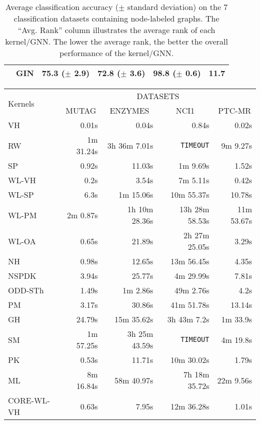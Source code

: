 \documentclass[twoside,11pt]{article}
\begin{document}
\begin{table}[!t]
\begin{tabular}{llcccc}
& GIN & 75.3 {\tiny ($\pm$ 2.9)} & 72.8 {\tiny ($\pm$ 3.6)} & 98.8 {\tiny ($\pm$ 0.6)} & \multicolumn{1}{c}{11.7} \\
\bottomrule
\end{tabular}
\caption{Average classification accuracy ($\pm$ standard deviation) on the $7$ classification datasets containing node-labeled graphs. The ``Avg. Rank'' column illustrates the average rank of each kernel/GNN. The lower the average rank, the better the overall performance of the kernel/GNN.}
\label{tab:results_labeled}
\end{table}

\begin{table}[t]
\centering
\scriptsize
\def\arraystretch{1.05}
\begin{tabular}{lrrrr} \toprule
\multirow{3}{*}{Kernels} & \multicolumn{4}{c}{DATASETS} \\ \cline{2-5}
& \multicolumn{1}{c}{\multirow{2}{*}{MUTAG}} & \multicolumn{1}{c}{\multirow{2}{*}{ENZYMES}} & \multicolumn{1}{c}{\multirow{2}{*}{NCI1}} & \multicolumn{1}{c}{\multirow{2}{*}{PTC-MR}} \\
& & & & \\
\midrule
VH & 0.01s & 0.04s & 0.84s & 0.02s \\ 
RW & 1m 31.24s & 3h 36m 7.01s & \texttt{TIMEOUT} & 9m 9.27s \\ 
SP & 0.92s & 11.03s & 1m 9.69s & 1.52s \\ 
WL-VH & 0.2s & 3.54s & 7m 5.11s & 0.42s \\ 
WL-SP & 6.3s & 1m 15.06s & 10m 55.37s & 10.78s \\ 
WL-PM & 2m 0.87s & 1h 10m 28.36s & 13h 28m 58.53s & 11m 53.67s \\ 
WL-OA & 0.65s & 21.89s & 2h 27m 25.05s & 3.29s \\ 
NH & 0.98s & 12.65s & 13m 56.45s & 4.35s \\ 
NSPDK & 3.94s & 25.77s & 4m 29.99s & 7.81s \\ 
ODD-STh & 1.49s & 1m 2.86s & 49m 2.76s & 4.2s \\ 
PM & 3.17s & 30.86s & 41m 51.78s & 13.14s \\ 
GH & 24.79s & 15m 35.62s & 3h 43m 7.2s & 1m 33.9s \\ 
SM & 1m 57.25s & 3h 25m 43.59s & \texttt{TIMEOUT} & 4m 19.8s \\ 
PK & 0.53s & 11.71s & 10m 30.02s & 1.79s \\ 
ML & 8m 16.84s & 58m 40.97s & 7h 18m 35.72s & 22m 9.56s \\ 
CORE-WL-VH & 0.63s & 7.95s & 12m 36.28s & 1.01s \\ 

\end{tabular}
\end{table}
\end{document}
